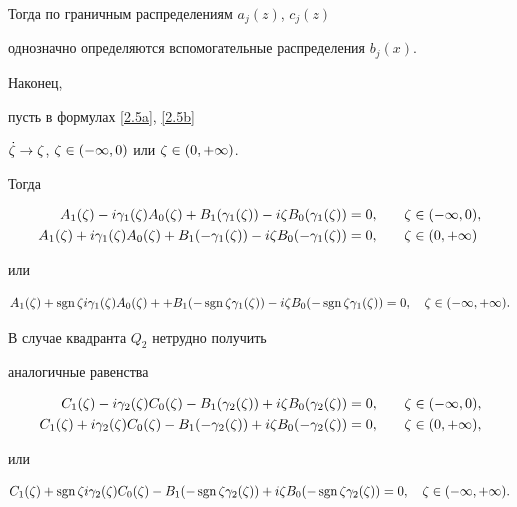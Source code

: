 Тогда по граничным распределениям $a_j(z)$, $c_j(z)$


однозначно определяются вспомогательные распределения $b_j(x)$.





Наконец,


пусть в формулах \eqref{2.5a}, \eqref{2.5b}


$\Dot{\zeta}\to\zeta$, $\zeta\in(-\infty,0)$ или $\zeta\in(0,+\infty)$.


Тогда


\begin{alignat*}{2}


A_1(\dz)-i\gafdz A_0(\dz)


+B_1(\gafdz)-i\dz B_0(\gafdz)&=0,&\quad \dz&\in(-\infty,0) ,\\


%


A_1(\dz)+i\gafdz A_0(\dz)


+B_1(-\gafdz)-i\dz B_0(-\gafdz) &= 0,&\quad \dz&\in(0,+\infty)


\end{alignat*}


или


\begin{equation}\label{3.9}


A_1(\dz)+\sgn\dz i\gafdz A_0(\dz) +


+B_1(-\sgn\dz \gafdz)-i\dz B_0(-\sgn\dz \gafdz) = 0,


\quad \dz\in(-\infty,+\infty) .


\end{equation}





В случае квадранта $Q_2$ нетрудно получить


аналогичные равенства


\begin{alignat*}{2}


C_1(\dz)-i\gasdz C_0(\dz)-B_1(\gasdz)+i\dz B_0(\gasdz) &= 0,


&\quad \dz&\in(-\infty,0) , \\


C_1(\dz)+i\gasdz C_0(\dz)


-B_1(-\gasdz)+i\dz B_0(-\gasdz) &= 0, &\quad \dz&\in(0,+\infty),


\end{alignat*}


или


\begin{equation}\label{3.11}


C_1(\dz)+\sgn\dz i\gasdz C_0(\dz) -


B_1(-\sgn\dz \gasdz)+i\dz B_0(-\sgn\dz \gasdz) = 0,


\quad \dz\in(-\infty,+\infty) .


\end{equation}





